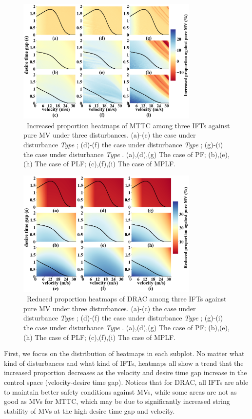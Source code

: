 \documentclass[journal]{IEEEtran}
\begin{document}
\begin{figure}
  \includegraphics[width=9cm]{fig5.3_1.png}
  \caption{~Increased proportion heatmaps of MTTC among three IFTs against pure MV under three disturbances. (a)-(c) the case under disturbance \textit{Type \uppercase\expandafter{}}; (d)-(f) the case under disturbance \textit{Type \uppercase\expandafter{}}; (g)-(i) the case under disturbance \textit{Type \uppercase\expandafter{}}. (a),(d),(g) The case of PF; (b),(e),(h) The case of PLF; (c),(f),(i) The case of MPLF.}
  \label{Figure3_1}
\end{figure}

\begin{figure}
  \includegraphics[width=9cm]{fig5.3_2.png}
  \caption{~Reduced proportion heatmaps of DRAC among three IFTs against pure MV under three disturbances. (a)-(c) the case under disturbance \textit{Type \uppercase\expandafter{}}; (d)-(f) the case under disturbance \textit{Type \uppercase\expandafter{}}; (g)-(i) the case under disturbance \textit{Type \uppercase\expandafter{}}. (a),(d),(g) The case of PF; (b),(e),(h) The case of PLF; (c),(f),(i) The case of MPLF.}
  \label{Figure3_2}
\end{figure}

First, we focus on the distribution of heatmaps in each subplot. No matter what kind of disturbances and what kind of IFTs, heatmaps all show a trend that the increased proportion decreases as the velocity and desire time gap increase in the control space (velocity-desire time gap). Notices that for DRAC, all IFTs are able to maintain better safety conditions against MVs, while some areas are not as good as MVs for MTTC, which may be due to significantly increased string stability of MVs at the high desire time gap and velocity.
\end{document}
